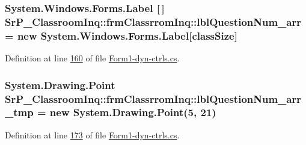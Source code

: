\hypertarget{class_sr_p___classroom_inq_1_1frm_classrrom_inq_ae46e928c386c686caa96bfe4f302c2f1}{
\subsubsection[{lbl\-Question\-Num\-\_\-arr}]{\setlength{\rightskip}{0pt plus 5cm}\-System.\-Windows.\-Forms.\-Label \mbox{[}$\,$\mbox{]} {\bf \-Sr\-P\-\_\-\-Classroom\-Inq\-::frm\-Classrrom\-Inq\-::lbl\-Question\-Num\-\_\-arr} = new \-System.\-Windows.\-Forms.\-Label\mbox{[}{\bf class\-Size}\mbox{]}}}
\label{class_sr_p___classroom_inq_1_1frm_classrrom_inq_ae46e928c386c686caa96bfe4f302c2f1}


\-Definition at line \hyperlink{_form1-dyn-ctrls_8cs_source_l00160}{160} of file \hyperlink{_form1-dyn-ctrls_8cs_source}{\-Form1-\/dyn-\/ctrls.\-cs}.

\hypertarget{class_sr_p___classroom_inq_1_1frm_classrrom_inq_a9af0d3cc5171be1c8b01ea1e208d61ee}{
\subsubsection[{lbl\-Question\-Num\-\_\-arr\-\_\-tmp}]{\setlength{\rightskip}{0pt plus 5cm}\-System.\-Drawing.\-Point {\bf \-Sr\-P\-\_\-\-Classroom\-Inq\-::frm\-Classrrom\-Inq\-::lbl\-Question\-Num\-\_\-arr\-\_\-tmp} = new \-System.\-Drawing.\-Point(5, 21)}}
\label{class_sr_p___classroom_inq_1_1frm_classrrom_inq_a9af0d3cc5171be1c8b01ea1e208d61ee}


\-Definition at line \hyperlink{_form1-dyn-ctrls_8cs_source_l00173}{173} of file \hyperlink{_form1-dyn-ctrls_8cs_source}{\-Form1-\/dyn-\/ctrls.\-cs}.

